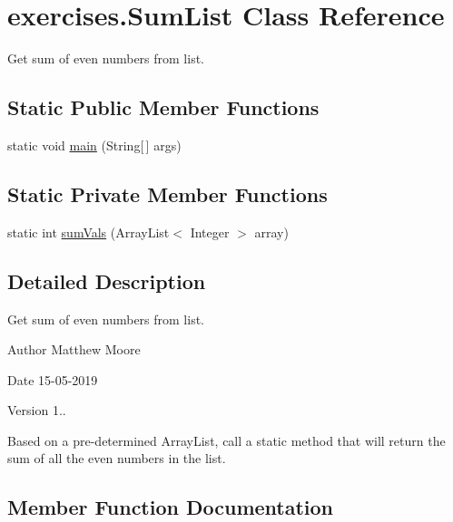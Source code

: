 \hypertarget{classexercises_1_1_sum_list}{}\section{exercises.\+Sum\+List Class Reference}
\label{classexercises_1_1_sum_list}


Get sum of even numbers from list.  


\subsection*{Static Public Member Functions}
\begin{DoxyCompactItemize}
\item 
static void \mbox{\hyperlink{classexercises_1_1_sum_list_a1d4b3ab53dfdf844a2880921600a269e}{main}} (String\mbox{[}$\,$\mbox{]} args)
\end{DoxyCompactItemize}
\subsection*{Static Private Member Functions}
\begin{DoxyCompactItemize}
\item 
static int \mbox{\hyperlink{classexercises_1_1_sum_list_a04969d5dd6fdae5d0a6b550c3dcd0bfc}{sum\+Vals}} (Array\+List$<$ Integer $>$ array)
\end{DoxyCompactItemize}


\subsection{Detailed Description}
Get sum of even numbers from list. 

\begin{DoxyAuthor}{Author}
Matthew Moore 
\end{DoxyAuthor}
\begin{DoxyDate}{Date}
15-\/05-\/2019 
\end{DoxyDate}
\begin{DoxyVersion}{Version}
1..
\end{DoxyVersion}
Based on a pre-\/determined Array\+List, call a static method that will return the sum of all the even numbers in the list. 

\subsection{Member Function Documentation}
\mbox{\label{classexercises_1_1_sum_list_a1d4b3ab53dfdf844a2880921600a269e}} 
